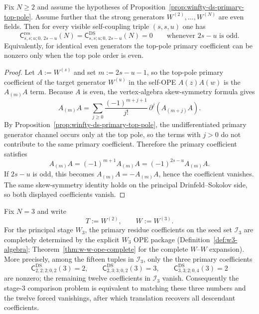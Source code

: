 \begin{proposition}
\label{prop:winfty-ds-self-ope-parity}
Fix $N \ge 2$ and assume the hypotheses of
Proposition~\ref{prop:winfty-ds-primary-top-pole}. Assume further
that the strong generators $W^{(2)},\dots,W^{(N)}$ are even fields.
Then for every visible self-coupling triple $(s,s,u)$ one has
\[
\mathsf{C}^{\mathrm{res}}_{s,s;u;0,\,2s-u}(N)
=
\mathsf{C}^{\mathrm{DS}}_{s,s;u;0,\,2s-u}(N)
=0
\qquad\text{whenever } 2s-u \text{ is odd}.
\]
Equivalently, for identical even generators the top-pole primary
coefficient can be nonzero only when the top pole order is even.
\end{proposition}

\begin{proof}
Let $A:=W^{(s)}$ and set $m:=2s-u-1$, so the top-pole primary
coefficient of the target generator $W^{(u)}$ in the self-OPE
$A(z)A(w)$ is the $A_{(m)}A$ term. Because $A$ is even, the
vertex-algebra skew-symmetry formula gives
\[
A_{(m)}A
=
\sum_{j\ge 0}\frac{(-1)^{m+j+1}}{j!}\,\partial^j(A_{(m+j)}A).
\]
By Proposition~\ref{prop:winfty-ds-primary-top-pole}, the
undifferentiated primary generator channel occurs only at the top pole,
so the terms with $j>0$ do not contribute to the same primary
coefficient. Therefore the primary coefficient satisfies
\[
A_{(m)}A = (-1)^{m+1}A_{(m)}A = (-1)^{2s-u}A_{(m)}A.
\]
If $2s-u$ is odd, this becomes $A_{(m)}A=-A_{(m)}A$, hence the
coefficient vanishes. The same skew-symmetry identity holds on the
principal Drinfeld--Sokolov side, so both displayed coefficients
vanish.
\end{proof}

\begin{proposition}
\label{prop:winfty-ds-stage3-explicit-packet}
Fix $N=3$ and write
\[
T:=W^{(2)},
\qquad
W:=W^{(3)}.
\]
For the principal stage $W_3$, the primary residue coefficients on the
seed set $\mathcal{I}_3$ are completely determined by the explicit
$W_3$ OPE package (Definition~\ref{def:w3-algebra};
Theorem~\ref{thm:w-w-ope-complete} for the complete $W$--$W$
expansion).
More precisely, among the fifteen tuples in $\mathcal{I}_3$, only the
three primary coefficients
\[
\mathsf{C}^{\mathrm{DS}}_{2,2;2;0,2}(3)=2,
\qquad
\mathsf{C}^{\mathrm{DS}}_{2,3;3;0,2}(3)=3,
\qquad
\mathsf{C}^{\mathrm{DS}}_{3,3;2;0,4}(3)=2
\]
are nonzero; the remaining twelve coefficients in $\mathcal{I}_3$
vanish. Consequently the stage-$3$ comparison problem is equivalent to
matching these three numbers and the twelve forced vanishings, after
which translation recovers all descendant coefficients.
\end{proposition}

